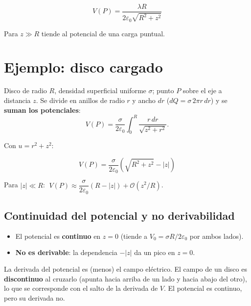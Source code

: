 \documentclass[12pt,a4paper]{article}
\begin{document}
\begin{keybox}
  \[
  \boxed{V(P) = \frac{\lambda R}{2\varepsilon_0\sqrt{R^2+z^2}}}
  \]
\end{keybox}

Para $z \gg R$ tiende al potencial de una carga puntual.

\section{Ejemplo: disco cargado}

Disco de radio $R$, densidad superficial uniforme $\sigma$; punto $P$
sobre el eje a distancia $z$. Se divide en anillos de radio $r$ y ancho
$dr$ ($dQ = \sigma\,2\pi r\, dr$) y se \textbf{suman los potenciales}:
\[
V(P) = \frac{\sigma}{2\varepsilon_0}\int_0^{R}\frac{r\, dr}{\sqrt{z^2+r^2}}.
\]

Con $u = r^2+z^2$:

\begin{keybox}
  \[
  \boxed{V(P) = \frac{\sigma}{2\varepsilon_0}\left(\sqrt{R^2+z^2} - |z|\right)}
  \]
\end{keybox}

Para $|z| \ll R$: $\;V(P) \approx \dfrac{\sigma}{2\varepsilon_0}(R - |z|)
+ \mathcal{O}(z^2/R)$.

\subsection{Continuidad del potencial y no derivabilidad}

\begin{itemize}[nosep]
  \item El potencial es \textbf{continuo} en $z=0$ (tiende a
        $V_0 = \sigma R/2\varepsilon_0$ por ambos lados).
  \item \textbf{No es derivable}: la dependencia $-|z|$ da un pico en
        $z=0$.
\end{itemize}

\begin{warnbox}
  La derivada del potencial es (menos) el campo eléctrico. El campo de
  un disco es \textbf{discontinuo} al cruzarlo (apunta hacia arriba de un
  lado y hacia abajo del otro), lo que se corresponde con el salto de la
  derivada de $V$. El potencial es continuo, pero su derivada no.
\end{warnbox}
\end{document}
